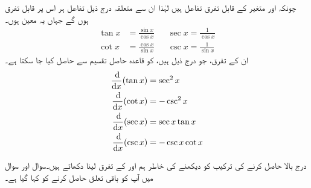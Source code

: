 چونکہ  اور  متغیر  کے قابل تفرق تفاعل ہیں لہٰذا ان سے متعلقہ درج ذیل تفاعل ہر اس   پر قابل تفرق ہوں گے جہاں یہ معین ہوں۔
\begin{align*}
\tan x&=\frac{\sin x}{\cos x}&&\sec x=\frac{1}{\cos x}\\[0.5em]
\cot x&=\frac{\cos x}{\sin x}&& \csc x=\frac{1}{\sin x}
\end{align*} 
ان کے تفرق،  جو درج ذیل ہیں،  کو قاعدہ حاصل تقسیم سے حاصل کیا جا سکتا ہے۔ 
\begin{gather}
\begin{aligned}\label{مساوات_تفرق_تکونیاتی_تفاعل_الف}
\frac{\dif}{\dif x}(\tan x)&=\sec^2 x\\
\frac{\dif}{\dif x}(\cot x)&=-\csc^2x\\
\frac{\dif}{\dif x}(\sec x)&=\sec x\tan x\\
\frac{\dif}{\dif x}(\csc x)&=-\csc x\cot x
\end{aligned}
\end{gather}

درج بالا حاصل کرنے کی ترکیب کو دیکھنے کی خاطر ہم  اور  کے تفرق لینا دکھاتے ہیں۔سوال  اور سوال  میں آپ کو باقی تعلق حاصل کرنے کو کہا گیا ہے۔

